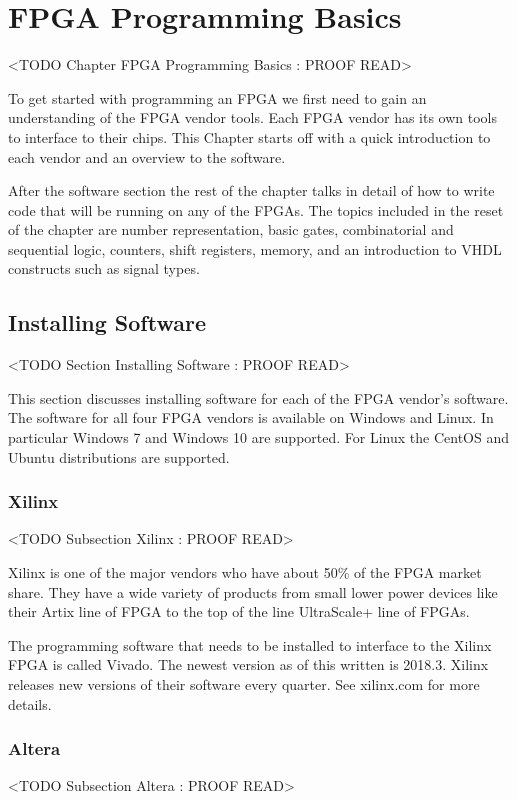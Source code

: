\chapter{FPGA Programming Basics}
	<TODO Chapter FPGA Programming Basics : PROOF READ>

To get started with programming an \ac{FPGA} we first need to gain an understanding of the \ac{FPGA} vendor tools. Each \ac{FPGA} vendor has its own tools to interface to their chips. This Chapter starts off with a quick introduction to each vendor and an overview to the software. 

After the software section the rest of the chapter talks in detail of how to write code that will be running on any of the \ac{FPGA}s. The topics included in the reset of the chapter are number representation, basic gates, combinatorial and sequential logic, counters, shift registers, memory, and an introduction to \ac{VHDL} constructs such as signal types. 
	
\section{Installing Software}
	<TODO Section Installing Software : PROOF READ>

This section discusses installing software for each of the \ac{FPGA} vendor's software. The software for all four \ac{FPGA} vendors is available on Windows and Linux. In particular Windows 7 and Windows 10 are supported. For Linux the CentOS and Ubuntu distributions are supported. 
	
\subsection{Xilinx}
	<TODO Subsection Xilinx : PROOF READ>

Xilinx is one of the major vendors who have about 50\% of the \ac{FPGA} market share. They have a wide variety of products from small lower power devices like their Artix line of \ac{FPGA} to the top of the line UltraScale+ line of \ac{FPGA}s.

The programming software that needs to be installed to interface to the Xilinx \ac{FPGA} is called Vivado. The newest version as of this written is 2018.3. Xilinx releases new versions of their software every quarter. See xilinx.com for more details. 	
	
\subsection{Altera}
	<TODO Subsection Altera : PROOF READ>

